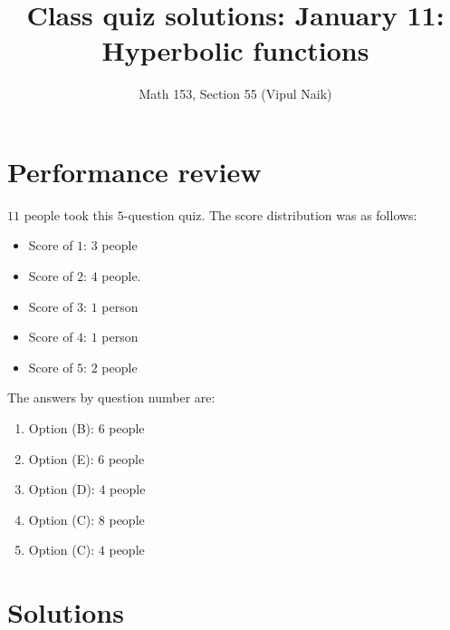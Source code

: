 \documentclass[10pt]{amsart}
\title{Class quiz solutions: January 11: Hyperbolic functions}
\author{Math 153, Section 55 (Vipul Naik)}
\begin{document}
\maketitle

\section{Performance review}

$11$ people took this $5$-question quiz. The score distribution was as
follows:

\begin{itemize}
\item Score of $1$: $3$ people
\item Score of $2$: $4$ people.
\item Score of $3$: $1$ person
\item Score of $4$: $1$ person
\item Score of $5$: $2$ people
\end{itemize}

The answers by question number are:

\begin{enumerate}
\item Option (B): $6$ people
\item Option (E): $6$ people
\item Option (D): $4$ people
\item Option (C): $8$ people
\item Option (C): $4$ people
\end{enumerate}
\section{Solutions}
\end{document}
